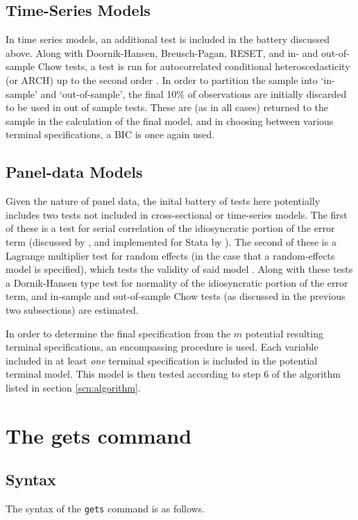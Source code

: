 \documentclass[bib]{statapress}
\begin{document}
\subsection{Time-Series Models}
\label{sscn:Ats}
In time series models, an additional test is included in the battery discussed 
above.  Along with Doornik-Hansen, Breusch-Pagan, RESET, and in- and 
out-of-sample Chow tests, a test is run for autocorrelated conditional 
heteroscedasticity (or ARCH) up to the second order \citep{Engle1982}.  In 
order to partition the sample into `in-sample' and `out-of-sample', the final 
10\% of observations are initially discarded to be used in out of sample tests.
These are (as in all cases) returned to the sample in the calculation of the 
final model, and in choosing between various terminal specifications, a BIC is
once again used.


\subsection{Panel-data Models}
\label{sscn:Axt}
Given the nature of panel data, the inital battery of tests here potentially
includes two tests not included in cross-sectional or time-series models.  The 
first of these is a test for serial correlation of the idiosyncratic portion of
the error term (discussed by \citet{Wooldridge2002}, and implemented for Stata 
by \citet{Drukker2003}).  The second of these is a Lagrange multiplier test for
random effects (in the case that a random-effects model is specified), which 
tests the validity of said model \citep{BreuschPagan1980}. Along with these 
tests a Dornik-Hansen type test for normality of the idiosyncratic portion of
the error term, and in-sample and out-of-sample Chow tests (as discussed in the
previous two subsections) are estimated.

In order to determine the final specification from the $m$ potential resulting 
terminal specifications, an encompassing procedure is used.  Each variable 
included in at least \emph{one} terminal specification is included in the 
potential terminal model.  This model is then tested according to step 6 of the
algorithm listed in section \ref{scn:algorithm}.



\section{The gets command}
\subsection{Syntax}
The syntax of the \texttt{gets} command is as follows.
\end{document}
